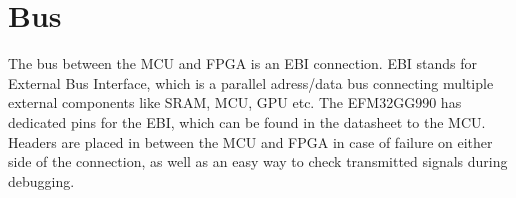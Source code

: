 \documentclass[../main/report.tex]{subfiles}
\begin{document}
\section{Bus}
The bus between the MCU and FPGA is an EBI connection.
EBI stands for External Bus Interface, which is a parallel adress/data bus connecting multiple external components like SRAM, MCU, GPU etc.
The EFM32GG990 has dedicated pins for the EBI, which can be found in the datasheet \cite{EFM32 Datasheet} to the MCU.
Headers are placed in between the MCU and FPGA in case of failure on either side of the connection, as well as an easy way to check transmitted signals during debugging.
\end{document}
